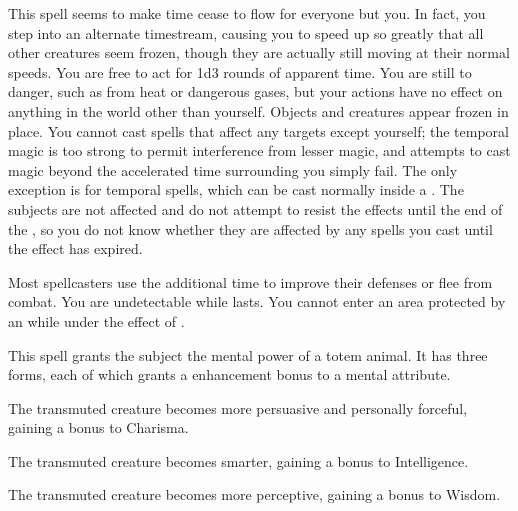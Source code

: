 \begin{spelleffect}
    This spell seems to make time cease to flow for everyone but you. In fact, you step into an alternate timestream, causing you to speed up so greatly that all other creatures seem frozen, though they are actually still moving at their normal speeds. You are free to act for 1d3 rounds of apparent time. You are still \vulnerable to danger, such as from heat or dangerous gases, but your actions have no effect on anything in the world other than yourself. Objects and creatures appear frozen in place. You cannot cast spells that affect any targets except yourself; the temporal magic is too strong to permit interference from lesser magic, and attempts to cast magic beyond the accelerated time surrounding you simply fail. The only exception is for temporal spells, which can be cast normally inside a . The subjects are not affected and do not attempt to resist the effects until the end of the , so you do not know whether they are affected by any spells you cast until the effect has expired.
\end{spelleffect}
\begin{spellnotes}
    Most spellcasters use the additional time to improve their defenses or flee from combat. You are undetectable while  lasts. You cannot enter an area protected by an  while under the effect of .
\end{spellnotes}

\spelldur{\durshort}
\begin{spelleffect}
    This spell grants the subject the mental power of a totem animal. It has three forms, each of which grants a  enhancement bonus to a mental attribute.
    \par {} The transmuted creature becomes more persuasive and personally forceful, gaining a bonus to Charisma.
    \par {} The transmuted creature becomes smarter, gaining a bonus to Intelligence.
    \par {} The transmuted creature becomes more perceptive, gaining a bonus to Wisdom.
\end{spelleffect}

